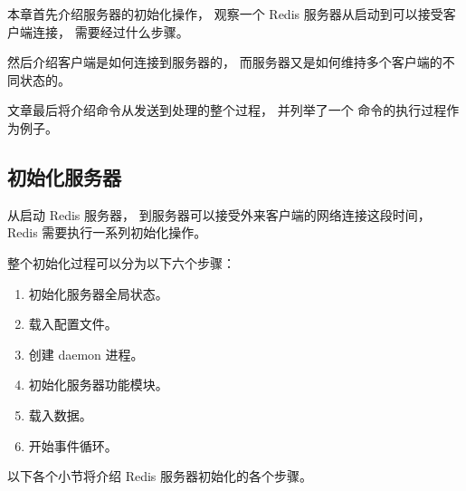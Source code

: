\documentclass[a4paper,11pt,english]{sphinxmanual}
\begin{document}
本章首先介绍服务器的初始化操作，
观察一个 Redis 服务器从启动到可以接受客户端连接，
需要经过什么步骤。

然后介绍客户端是如何连接到服务器的，
而服务器又是如何维持多个客户端的不同状态的。

文章最后将介绍命令从发送到处理的整个过程，
并列举了一个  命令的执行过程作为例子。


\subsection{初始化服务器}
\label{internal/redis:id2}
从启动 Redis 服务器，
到服务器可以接受外来客户端的网络连接这段时间，
Redis 需要执行一系列初始化操作。

整个初始化过程可以分为以下六个步骤：
\begin{enumerate}
\item {} 
初始化服务器全局状态。

\item {} 
载入配置文件。

\item {} 
创建 daemon 进程。

\item {} 
初始化服务器功能模块。

\item {} 
载入数据。

\item {} 
开始事件循环。

\end{enumerate}

以下各个小节将介绍 Redis 服务器初始化的各个步骤。
\end{document}
